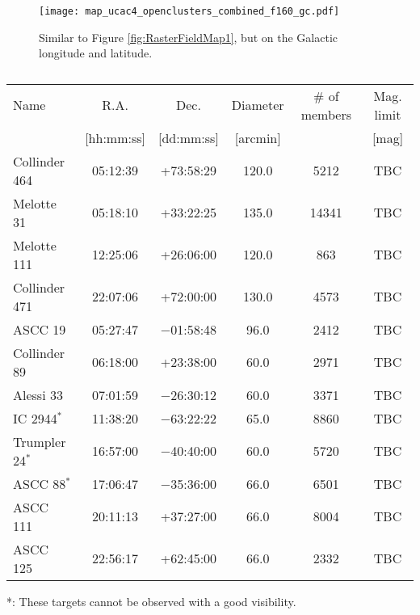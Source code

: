 \begin{figure}[!ht]
\begin{center}
\texttt{[image: map\_ucac4\_openclusters\_combined\_f160\_gc.pdf]}
\end{center}
\caption{Similar to Figure \ref{fig:RasterFieldMap1}, but on the Galactic longitude and latitude.
}
\label{fig:RasterFieldMap2}
\end{figure}


\begin{table}[!ht]
\begin{center}
\caption{}
\label{tab:open_clusters}
\begin{tabular}{lccccc}  \hline
Name &  R.A. & Dec. & Diameter & \# of members & Mag. limit\\ 
          & [hh:mm:ss] & [dd:mm:ss] & [arcmin] & & [mag]\\
\hline \hline
Collinder 464 & 05:12:39 & +73:58:29  & 120.0 &  5212 & TBC  \\
Melotte 31     & 05:18:10 & +33:22:25  & 135.0  & 14341 & TBC \\
Melotte 111   & 12:25:06  & +26:06:00 & 120.0   & 863 & TBC    \\         
Collinder 471 & 22:07:06  & +72:00:00 & 130.0  & 4573 & TBC \\
\hline
ASCC 19       & 05:27:47 & $-$01:58:48  &  96.0    &  2412 & TBC \\
Collinder 89   & 06:18:00 & +23:38:00  &  60.0    &  2971 & TBC \\
Alessi 33        & 07:01:59 & $-$26:30:12  &  60.0   &   3371 & TBC \\
IC 2944$^{*}$  & 11:38:20  & $-$63:22:22  &  65.0   &  8860 & TBC \\
Trumpler 24$^{*}$  & 16:57:00  & $-$40:40:00 &  60.0   &  5720 & TBC \\
ASCC 88$^{*}$    & 17:06:47  & $-$35:36:00  &  66.0  &  6501 & TBC \\
ASCC 111       &  20:11:13 & +37:27:00 &  66.0  &  8004 & TBC \\
ASCC 125      &  22:56:17 & +62:45:00  &  66.0  &  2332 & TBC \\
\hline \hline
\end{tabular}
\end{center}
*: These targets cannot be observed with a good visibility.
\end{table}



